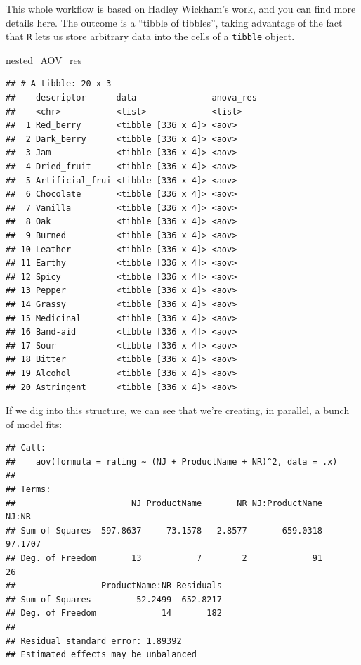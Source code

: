 \documentclass[
]{book}
\newenvironment{Shaded}{\begin{snugshade}}{\end{snugshade}}
\newcommand{\CommentTok}[1]{\textcolor[rgb]{0.56,0.35,0.01}{\textit{#1}}}
\newcommand{\DecValTok}[1]{\textcolor[rgb]{0.00,0.00,0.81}{#1}}
\newcommand{\NormalTok}[1]{#1}
\newcommand{\SpecialCharTok}[1]{\textcolor[rgb]{0.81,0.36,0.00}{\textbf{#1}}}
\begin{document}
This whole workflow is based on Hadley Wickham's work, and you can find more details here. The outcome is a ``tibble of tibbles'', taking advantage of the fact that \texttt{R} lets us store arbitrary data into the cells of a \texttt{tibble} object.

\begin{Shaded}
\begin{Highlighting}[]
\NormalTok{nested\_AOV\_res}
\end{Highlighting}
\end{Shaded}

\begin{verbatim}
## # A tibble: 20 x 3
##    descriptor      data               anova_res
##    <chr>           <list>             <list>   
##  1 Red_berry       <tibble [336 x 4]> <aov>    
##  2 Dark_berry      <tibble [336 x 4]> <aov>    
##  3 Jam             <tibble [336 x 4]> <aov>    
##  4 Dried_fruit     <tibble [336 x 4]> <aov>    
##  5 Artificial_frui <tibble [336 x 4]> <aov>    
##  6 Chocolate       <tibble [336 x 4]> <aov>    
##  7 Vanilla         <tibble [336 x 4]> <aov>    
##  8 Oak             <tibble [336 x 4]> <aov>    
##  9 Burned          <tibble [336 x 4]> <aov>    
## 10 Leather         <tibble [336 x 4]> <aov>    
## 11 Earthy          <tibble [336 x 4]> <aov>    
## 12 Spicy           <tibble [336 x 4]> <aov>    
## 13 Pepper          <tibble [336 x 4]> <aov>    
## 14 Grassy          <tibble [336 x 4]> <aov>    
## 15 Medicinal       <tibble [336 x 4]> <aov>    
## 16 Band-aid        <tibble [336 x 4]> <aov>    
## 17 Sour            <tibble [336 x 4]> <aov>    
## 18 Bitter          <tibble [336 x 4]> <aov>    
## 19 Alcohol         <tibble [336 x 4]> <aov>    
## 20 Astringent      <tibble [336 x 4]> <aov>
\end{verbatim}

If we dig into this structure, we can see that we're creating, in parallel, a bunch of model fits:

\begin{Shaded}
\end{Shaded}

\begin{verbatim}
## Call:
##    aov(formula = rating ~ (NJ + ProductName + NR)^2, data = .x)
## 
## Terms:
##                       NJ ProductName       NR NJ:ProductName    NJ:NR
## Sum of Squares  597.8637     73.1578   2.8577       659.0318  97.1707
## Deg. of Freedom       13           7        2             91       26
##                 ProductName:NR Residuals
## Sum of Squares         52.2499  652.8217
## Deg. of Freedom             14       182
## 
## Residual standard error: 1.89392
## Estimated effects may be unbalanced
\end{verbatim}
\end{document}
